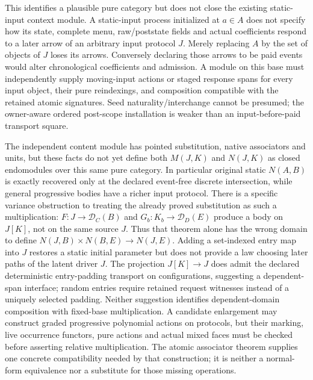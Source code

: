 \documentclass[11pt]{article}
\begin{document}
This identifies a plausible pure category but does not close the existing static-input context module. A static-input process initialized at $a\in A$ does not specify how its state, complete menu, raw/poststate fields and actual coefficients respond to a later arrow of an arbitrary input protocol $J$. Merely replacing $A$ by the set of objects of $J$ loses its arrows. Conversely declaring those arrows to be paid events would alter chronological coefficients and admission. A module on this base must independently supply moving-input actions or staged response spans for every input object, their pure reindexings, and composition compatible with the retained atomic signatures. Seed naturality/interchange cannot be presumed; the owner-aware ordered post-scope installation is weaker than an input-before-paid transport square.

The independent content module has pointed substitution, native associators and units, but these facts do not yet define both $M(J,K)$ and $N(J,K)$ as closed endomodules over this same pure category. In particular original static $N(A,B)$ is exactly recovered only at the declared event-free discrete intersection, while general progressive bodies have a richer input protocol. There is a specific variance obstruction to treating the already proved substitution as such a multiplication: $F:J\to\mathcal D_C(B)$ and $G_b:K_b\to\mathcal D_D(E)$ produce a body on $J[K]$, not on the same source $J$. Thus that theorem alone has the wrong domain to define $N(J,B)\times N(B,E)\to N(J,E)$. Adding a set-indexed entry map into $J$ restores a static initial parameter but does not provide a law choosing later paths of the latent driver $J$. The projection $J[K]\to J$ does admit the declared deterministic entry-padding transport on configurations, suggesting a dependent-span interface; random entries require retained request witnesses instead of a uniquely selected padding. Neither suggestion identifies dependent-domain composition with fixed-base multiplication. A candidate enlargement may construct graded progressive polynomial actions on protocols, but their marking, live occurrence functors, pure actions and actual mixed faces must be checked before asserting relative multiplication. The atomic associator theorem supplies one concrete compatibility needed by that construction; it is neither a normal-form equivalence nor a substitute for those missing operations.
\end{document}
